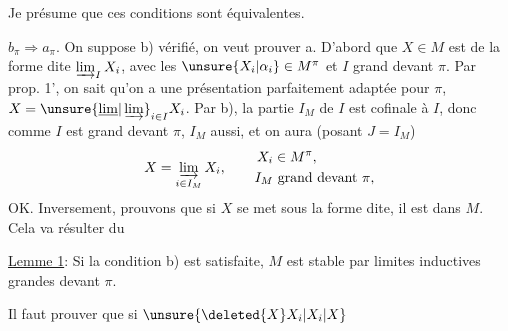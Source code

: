 
Je présume que ces conditions sont équivalentes.

$b_\pi\Rightarrow a_\pi$. On suppose b) vérifié, on veut prouver a. D'abord que  $X\in M$ est de la forme dite $\varinjlim_I X_i$, avec les $\unsure{X_i|\alpha_i}\in M^{\pi}$ et $I$ grand devant $\pi$. Par prop. 1', on sait qu'on a une présentation parfaitement adaptée pour $\pi$, $X=\unsure{\underline{\lim}|\varinjlim}_{i\in I}X_i$. Par b),  la partie $I_M$ de $I$ est cofinale à $I$, donc comme $I$ est grand devant $\pi$, $I_M$ aussi, et on aura (posant $J=I_M$)
\[
X=\varinjlim_{i\in I_M}X_i,\qquad\begin{aligned}
X_i&\in M^{\pi},\\
I_M&\text{ grand devant }\pi,
\end{aligned}
\]
OK. Inversement, prouvons que si $X$ se met sous la forme dite,  il est dans $M$. Cela va résulter du

\uline{Lemme 1}: Si  la condition  b)  est satisfaite, $M$ est stable par limites inductives grandes devant  $\pi$.


Il faut prouver que si $\unsure{\deleted{X}X_i|X_i|X}$

